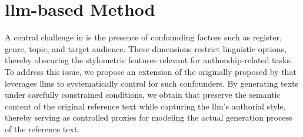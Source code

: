 \chapter{\acs{llm}-based \Imp{} Method}
\label{chap:llm_impostor_method}

A central challenge in \ai{} is the presence of confounding factors such as register, genre, topic, and target audience. 
These dimensions restrict linguistic options, thereby obscuring the stylometric features relevant for authorship-related tasks. 
To address this issue, we propose an extension of the \impAppr{} originally proposed by \citet{koppel_determining_2014} that leverages \acp{llm} to systematically control for such confounders. 
By generating texts under carefully constrained conditions, we obtain \imps{} that preserve the semantic content of the original reference text while capturing the \ac{llm}'s authorial style, thereby serving as controlled proxies for modeling the actual generation process of the reference text.







